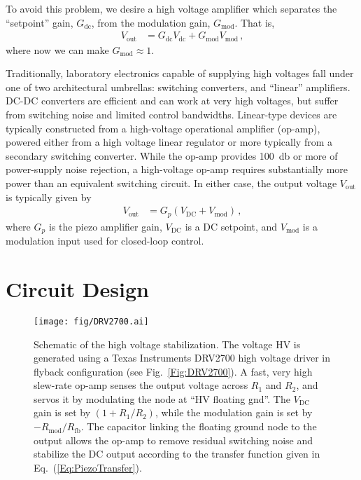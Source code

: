 \documentclass[aip,rsi,reprint]{revtex4-1} %
\begin{document}
To avoid this problem, we desire a high voltage amplifier which separates the ``setpoint'' gain, $G_{\text{dc}}$, from the modulation gain, $G_{\text{mod}}$. That is,
\begin{align}
  V_{\text{out}} &= G_{\text{dc}} V_{\text{dc}} + G_{\text{mod}} V_{\text{mod}}\, \text{,}
  \label{Eq:PiezoTransfer}
\end{align}
where now we can make $G_{\text{mod}} \approx 1$.

Traditionally, laboratory electronics capable of supplying high voltages fall under one of two architectural umbrellas: switching converters, and ``linear'' amplifiers.
DC-DC converters are efficient and can work at very high voltages, but suffer from switching noise and limited control bandwidths.
Linear-type devices are typically constructed from a high-voltage operational amplifier (op-amp), powered either from a high voltage linear regulator or more typically from a secondary switching converter.
While the op-amp provides \SI{100}{\decibel} or more of power-supply noise rejection, a high-voltage op-amp requires substantially more power than an equivalent switching circuit.
In either case, the output voltage  $V_{\text{out}}$ is typically given by
\begin{align}
  V_{\text{out}} &= G_p(V_{\text{DC}} + V_{\text{mod}})\, \text{,}
\end{align}
where $G_p$ is the piezo amplifier gain, $V_{\text{DC}}$ is a DC setpoint, and $V_{\text{mod}}$ is a modulation input used for closed-loop control.

\section{Circuit Design}
\label{Sec:Circuit}

\begin{figure*}[t]
\texttt{[image: fig/DRV2700.ai]}
\caption{Schematic of the high voltage stabilization.
The voltage HV is generated using a Texas Instruments DRV2700 high voltage driver in flyback configuration (see Fig.~\ref{Fig:DRV2700}).
A fast, very high slew-rate op-amp senses the output voltage across $R_1$ and $R_2$, and servos it by modulating the node at ``HV floating gnd''.
The $V_{\text{DC}}$ gain is set by $\left(1+R_1/R_2\right)$, while the modulation gain is set by $-R_{\text{mod}}/R_{\text{fb}}$.
The capacitor linking the floating ground node to the output allows the op-amp to remove residual switching noise and stabilize the DC output according to the transfer function given in Eq.~(\ref{Eq:PiezoTransfer}). \label{Fig:PiezoCircuit}}
\end{figure*}
\end{document}
